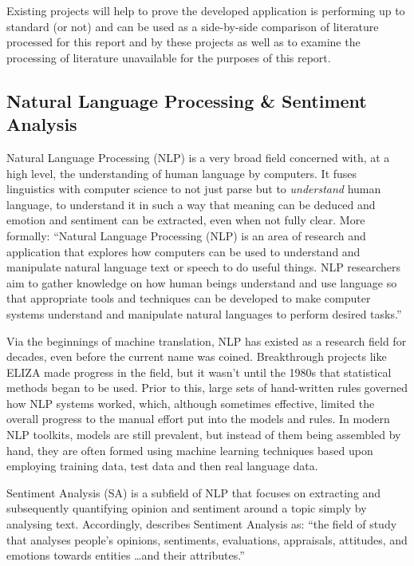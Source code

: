 \documentclass{article}
\begin{document}
        Existing projects will help to prove the developed application is performing up to standard (or not) and can be used as a side-by-side comparison of literature processed for this report and by these projects as well as to examine the processing of literature unavailable for the purposes of this report.
    \subsection{Natural Language Processing \& Sentiment Analysis}
        Natural Language Processing (NLP) is a very broad field concerned with, at a high level, the understanding of human language by computers. It fuses linguistics with computer science to not just parse but to \textit{understand} human language, to understand it in such a way that meaning can be deduced and emotion and sentiment can be extracted, even when not fully clear. More formally: ``Natural Language Processing (NLP) is an area of research and application that explores how computers can be used to understand and manipulate natural language text or speech to do useful things. NLP researchers aim to gather knowledge on how human beings understand and use language so that appropriate tools and techniques can be developed to make computer systems understand and manipulate natural languages to perform desired tasks.'' \citep{chowdhury2003natural}

        Via the beginnings of machine translation, NLP has existed as a research field for decades, even before the current name was coined. Breakthrough projects like ELIZA made progress in the field, but it wasn't until the 1980s that statistical methods began to be used. Prior to this, large sets of hand-written rules governed how NLP systems worked, which, although sometimes effective, limited the overall progress to the manual effort put into the models and rules. In modern NLP toolkits, models are still prevalent, but instead of them being assembled by hand, they are often formed using machine learning techniques based upon employing training data, test data and then real language data.

        Sentiment Analysis (SA) is a subfield of NLP that focuses on extracting and subsequently quantifying opinion and sentiment around a topic simply by analysing text. Accordingly, \cite{liu2012sentiment} describes Sentiment Analysis as: ``the field of study that analyses people’s opinions, sentiments, evaluations, appraisals, attitudes, and emotions towards entities \dots and their attributes.''
        
\end{document}
